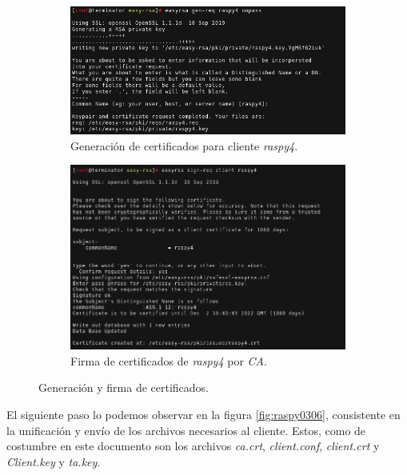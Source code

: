 \documentclass[a4paper, 11pt, titlepage]{article}
\begin{document}
        \begin{figure}[htp]
        \centering
            \begin{subfigure}[b]{1\linewidth}
            \includegraphics[width=1\textwidth]{resources/raspy01.png}
            \caption{Generación de certificados para cliente \textit{raspy4}.}
            \end{subfigure}

            \begin{subfigure}[b]{1\linewidth}
            \includegraphics[width=1\textwidth]{resources/raspy02.png}
            \caption{Firma de certificados de \textit{raspy4} por \textit{CA}.}
            \end{subfigure}
        \caption{Generación y firma de certificados.}
        \label{fig:raspy0102}
        \end{figure}

        El siguiente paso lo podemos observar en la figura \ref{fig:raspy0306}, consistente en 
        la unificación y envío de los archivos necesarios al cliente. Estos, como de costumbre
        en este documento son los archivos \textit{ca.crt}, \textit{client.conf}, \textit{client.crt}
        y \textit{Client.key} y \textit{ta.key}.
\end{document}
